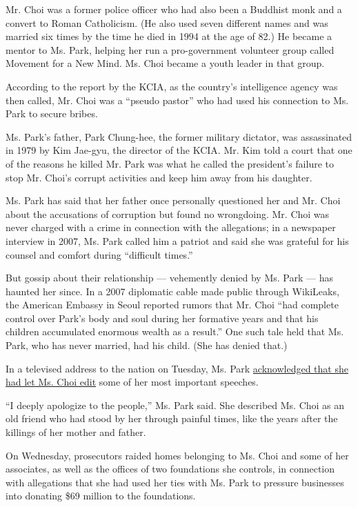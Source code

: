 Mr. Choi was a former police officer who had also been a Buddhist monk
and a convert to Roman Catholicism. (He also used seven different names
and was married six times by the time he died in 1994 at the age of 82.)
He became a mentor to Ms. Park, helping her run a pro-government
volunteer group called Movement for a New Mind. Ms. Choi became a youth
leader in that group.

According to the report by the KCIA, as the country's intelligence
agency was then called, Mr. Choi was a ``pseudo pastor'' who had used
his connection to Ms. Park to secure bribes.

Ms. Park's father, Park Chung-hee, the former military dictator, was
assassinated in 1979 by Kim Jae-gyu, the director of the KCIA. Mr. Kim
told a court that one of the reasons he killed Mr. Park was what he
called the president's failure to stop Mr. Choi's corrupt activities and
keep him away from his daughter.

Ms. Park has said that her father once personally questioned her and Mr.
Choi about the accusations of corruption but found no wrongdoing. Mr.
Choi was never charged with a crime in connection with the allegations;
in a newspaper interview in 2007, Ms. Park called him a patriot and said
she was grateful for his counsel and comfort during ``difficult times.''

But gossip about their relationship --- vehemently denied by Ms. Park
--- has haunted her since. In a 2007 diplomatic cable made public
through WikiLeaks, the American Embassy in Seoul reported rumors that
Mr. Choi ``had complete control over Park's body and soul during her
formative years and that his children accumulated enormous wealth as a
result.'' One such tale held that Ms. Park, who has never married, had
his child. (She has denied that.)

In a televised address to the nation on Tuesday, Ms. Park
\href{http://www.nytimes.com/aponline/2016/10/25/world/asia/ap-as-skorea-politics.html}{acknowledged
that she had let Ms. Choi edit} some of her most important speeches.

``I deeply apologize to the people,'' Ms. Park said. She described Ms.
Choi as an old friend who had stood by her through painful times, like
the years after the killings of her mother and father.

On Wednesday, prosecutors raided homes belonging to Ms. Choi and some of
her associates, as well as the offices of two foundations she controls,
in connection with allegations that she had used her ties with Ms. Park
to pressure businesses into donating \$69 million to the foundations.

